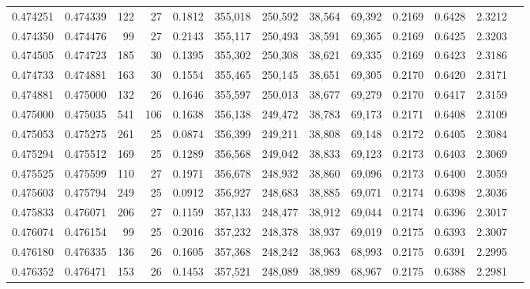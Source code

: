 \begin{tabular}{rrrrrrrrrrrrr}
0.474251 & 0.474339 &    122 &    27 &                                     0.1812 & 355,018 & 250,592 &  38,564 &  69,392 & 0.2169 & 0.6428 & 2.3212 \\
0.474350 & 0.474476 &     99 &    27 &                                     0.2143 & 355,117 & 250,493 &  38,591 &  69,365 & 0.2169 & 0.6425 & 2.3203 \\
0.474505 & 0.474723 &    185 &    30 &                                     0.1395 & 355,302 & 250,308 &  38,621 &  69,335 & 0.2169 & 0.6423 & 2.3186 \\
0.474733 & 0.474881 &    163 &    30 &                                     0.1554 & 355,465 & 250,145 &  38,651 &  69,305 & 0.2170 & 0.6420 & 2.3171 \\
0.474881 & 0.475000 &    132 &    26 &                                     0.1646 & 355,597 & 250,013 &  38,677 &  69,279 & 0.2170 & 0.6417 & 2.3159 \\
0.475000 & 0.475035 &    541 &   106 &                                     0.1638 & 356,138 & 249,472 &  38,783 &  69,173 & 0.2171 & 0.6408 & 2.3109 \\
0.475053 & 0.475275 &    261 &    25 &                                     0.0874 & 356,399 & 249,211 &  38,808 &  69,148 & 0.2172 & 0.6405 & 2.3084 \\
0.475294 & 0.475512 &    169 &    25 &                                     0.1289 & 356,568 & 249,042 &  38,833 &  69,123 & 0.2173 & 0.6403 & 2.3069 \\
0.475525 & 0.475599 &    110 &    27 &                                     0.1971 & 356,678 & 248,932 &  38,860 &  69,096 & 0.2173 & 0.6400 & 2.3059 \\
0.475603 & 0.475794 &    249 &    25 &                                     0.0912 & 356,927 & 248,683 &  38,885 &  69,071 & 0.2174 & 0.6398 & 2.3036 \\
0.475833 & 0.476071 &    206 &    27 &                                     0.1159 & 357,133 & 248,477 &  38,912 &  69,044 & 0.2174 & 0.6396 & 2.3017 \\
0.476074 & 0.476154 &     99 &    25 &                                     0.2016 & 357,232 & 248,378 &  38,937 &  69,019 & 0.2175 & 0.6393 & 2.3007 \\
0.476180 & 0.476335 &    136 &    26 &                                     0.1605 & 357,368 & 248,242 &  38,963 &  68,993 & 0.2175 & 0.6391 & 2.2995 \\
0.476352 & 0.476471 &    153 &    26 &                                     0.1453 & 357,521 & 248,089 &  38,989 &  68,967 & 0.2175 & 0.6388 & 2.2981 \\

\end{tabular}
